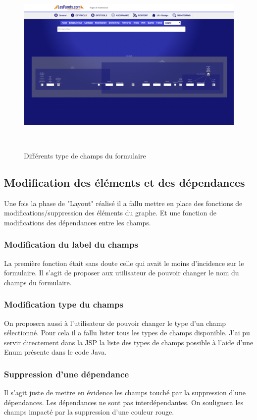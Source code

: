 \vspace{0.5in}
\begin{figure}[!h]
\centering
\includegraphics[height=9cm]{outil/layout-fields-2.png}
\caption{Différents type de champs du formulaire}
\end{figure}


\subsection{Modification des éléments et des dépendances}
Une fois la phase de "Layout" réalisé il a fallu mettre en place des fonctions de modifications/suppression des éléments du graphe. Et une fonction de modifications des dépendances entre les champs.

\subsubsection{Modification du label du champs}
La première fonction était sans doute celle qui avait le moins d’incidence sur le formulaire. Il s'agit de proposer aux utilisateur de pouvoir changer le nom du champs du formulaire.

\subsubsection{Modification type du champs}
On proposera aussi à l'utilisateur de pouvoir changer le type d'un champ sélectionné. Pour cela il a fallu lister tous les types de champs disponible. J'ai pu servir directement dans la JSP la liste des types de champs possible à l'aide d'une Enum présente dans le code Java.

\subsubsection{Suppression d’une dépendance}
Il s’agit juste de mettre en évidence les champs touché par la suppression d’une dépendances. Les dépendances ne sont pas interdépendantes. On soulignera les champs impacté par la suppression d'une couleur rouge.

